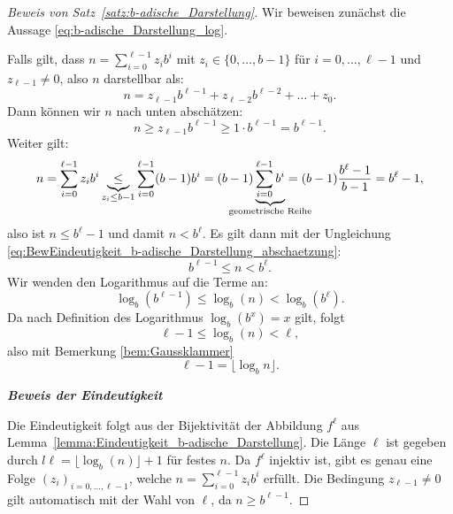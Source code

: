 \documentclass{article}
\begin{document}
    \begin{proof}[Beweis von Satz~\ref{satz:b-adische_Darstellung}] 

      Wir beweisen zunächst die Aussage \eqref{eq:b-adische_Darstellung_log}. 

      Falls gilt, dass $n=\sum_{i=0}^{\ell-1} z_i b^i$ mit $z_i \in \{0, \dots, b-1\}$ für $i = 0, \dots, \ell-1$ und $z_{\ell-1} \neq 0$, also $n$ darstellbar als:
      \begin{equation*}
        n = z_{\ell-1}b^{\ell-1} + z_{\ell-2}b^{\ell-2} + \dots + z_0.
      \end{equation*}
      Dann können wir $n$ nach unten abschätzen:
      \begin{equation*} \tag{$\ast$} \label{eq:BewEindeutigkeit_b-adische_Darstellung_abschaetzung}
        n \geq z_{\ell-1}b^{\ell-1} \geq 1 \cdot b^{\ell-1} = b^{\ell-1}.
      \end{equation*}
      Weiter gilt:
      \[n = \sum_{i=0}^{\ell-1} z_ib^i \underbrace{\leq}_{z_i \leq b-1} \sum_{i=0}^{\ell-1} (b-1)b^i = (b-1) \underbrace{\sum_{i=0}^{\ell-1} b^i}_{\mathclap{\text{geometrische Reihe}}} = (b-1) \frac{b^\ell-1}{b-1} = b^\ell-1,\]
      also ist $n \leq b^\ell-1$ und damit $n < b^\ell$.
      Es gilt dann mit der Ungleichung \eqref{eq:BewEindeutigkeit_b-adische_Darstellung_abschaetzung}: 
      \[b^{\ell-1} \leq n < b^\ell.\] 
      Wir wenden den Logarithmus auf die Terme an: 
      \begin{equation*}
        \log_b(b^{\ell-1}) \leq \log_b(n) < \log_b(b^\ell).
      \end{equation*}
      Da nach Definition des Logarithmus $\log_b(b^x) = x$ gilt, folgt
      \begin{equation*}
        \ell-1 \leq \log_b(n) < \ell,
      \end{equation*}
      also mit Bemerkung \ref{bem:Gaussklammer}
      \begin{equation*}
        \ell-1 = \lfloor \log_b n \rfloor.
      \end{equation*}

      \noindent\textbf{\textit{Beweis der Eindeutigkeit}}

      Die Eindeutigkeit folgt aus der Bijektivität der Abbildung $f^\ell$ aus Lemma~\ref{lemma:Eindeutigkeit_b-adische_Darstellung}.
      Die Länge $\ell$ ist gegeben durch $l\ell= \lfloor \log_b(n) \rfloor +1$ für festes $n$. 
      Da $f^\ell$ injektiv ist, gibt es genau eine Folge $(z_i)_{i=0,\dots,\ell-1}$, welche $n=\sum_{i=0}^{\ell-1} z_ib^i$ erfüllt.
      Die Bedingung $z_{\ell-1} \neq 0$ gilt automatisch mit der Wahl von $\ell$, da $n \geq b^{\ell-1}$.


\end{proof}
\end{document}
